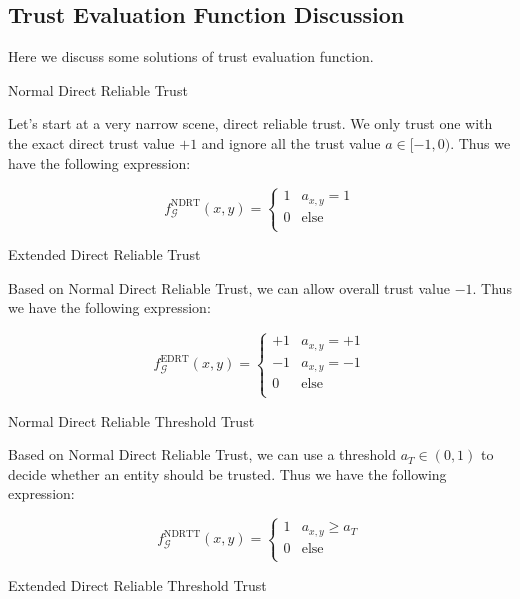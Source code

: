 \documentclass{article}
\begin{document}
\subsection{Trust Evaluation Function Discussion}

Here we discuss some solutions of trust evaluation function.

Normal Direct Reliable Trust

Let{'}s start at a very narrow scene, direct reliable trust. We only trust one with the exact direct trust value \(+1\) and ignore all the trust
value \(a\in [-1,0)\). Thus we have the following expression:

\begin{equation}
f_{\mathcal{G}}^{\text{NDRT}}(x,y)=\left\{
\begin{array}{cc}
 1 & a_{x,y}=1 \\
 0 & \text{else} \\
\end{array}
\right.
\end{equation}

Extended Direct Reliable Trust

Based on Normal Direct Reliable Trust, we can allow overall trust value \(-1\). Thus we have the following expression:

\begin{equation}
f_{\mathcal{G}}^{\text{EDRT}}(x,y)=\left\{
\begin{array}{cc}
 +1 & a_{x,y}=+1 \\
 -1 & a_{x,y}=-1 \\
 0 & \text{else} \\
\end{array}
\right.
\end{equation}

Normal Direct Reliable Threshold Trust

Based on Normal Direct Reliable Trust, we can use a threshold \(a_T\in (0,1)\) to decide whether an entity should be trusted. Thus we have the following
expression:

\begin{equation}
f_{\mathcal{G}}^{\text{NDRTT}}(x,y)=\left\{
\begin{array}{cc}
 1 & a_{x,y}\geq a_T \\
 0 & \text{else} \\
\end{array}
\right.
\end{equation}

Extended Direct Reliable Threshold Trust
\end{document}
